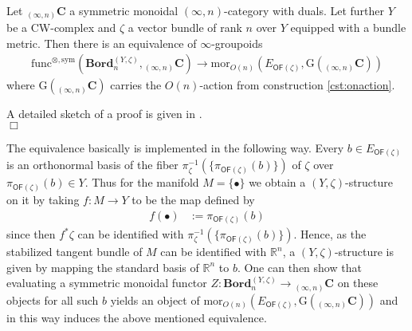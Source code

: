 \\
\begin{thm}
\label{thm:cobhypyzstruct}
Let ${_{(\infty,n)}}\mathbf{C}$ a symmetric monoidal $(\infty,n)$-category with duals. Let further $Y$ be a CW-complex and $\zeta$ a vector bundle of rank $n$ over $Y$ equipped with a bundle metric. Then there is an equivalence of $\infty$-groupoids
\begin{align*}
  \mathrm{func}^{\otimes,\mathrm{sym}}
  \left(
    \mathbf{Bord}_{n}^{(Y,\zeta)}
    ,
    {_{(\infty,n)}}\mathbf{C}
  \right)
  \to
  \mathrm{mor}_{O(n)}
  \left(
    E_{\mathsf{OF}(\zeta)}
    ,
    \mathrm{G}({_{(\infty,n)}}\mathbf{C})
  \right)
\end{align*}
where $\mathrm{G}({_{(\infty,n)}}\mathbf{C})$ carries the $O(n)$-action from construction \ref{cst:onaction}.
\end{thm}
\begin{prf}
A detailed sketch of a proof is given in \cite{dfcdc48c}.
\\
\phantom{proven}
\hfill
$\Box$
\end{prf}
The equivalence basically is implemented in the following way. Every $b \in E_{\mathsf{OF}(\zeta)}$ is an orthonormal basis of the fiber $\pi_{\zeta}^{-1}(\lbrace \pi_{\mathsf{OF}(\zeta)}(b) \rbrace)$ of $\zeta$ over $\pi_{\mathsf{OF}(\zeta)}(b) \in Y$. Thus for the manifold $M = \lbrace \bullet \rbrace$ we obtain a $(Y,\zeta)$-structure on it by taking $f \colon M \to Y$ to be the map defined by
\begin{align*}
  f(\bullet)
  &:=
  \pi_{\mathsf{OF}(\zeta)}(b)
\end{align*}
since then $f^{\ast}\zeta$ can be identified with $\pi_{\zeta}^{-1}(\lbrace \pi_{\mathsf{OF}(\zeta)}(b) \rbrace)$. Hence, as the stabilized tangent bundle of $M$ can be identified with $\mathbb{R}^{n}$, a $(Y,\zeta)$-structure is given by mapping the standard basis of $\mathbb{R}^{n}$ to $b$. One can then show that evaluating a symmetric monoidal functor $Z \colon \mathbf{Bord}_{n}^{(Y,\zeta)} \to {_{(\infty,n)}}\mathbf{C}$ on these objects for all such $b$ yields an object of  $\mathrm{mor}_{O(n)}(E_{\mathsf{OF}(\zeta)},\mathrm{G}({_{(\infty,n)}}\mathbf{C}))$ and in this way induces the above mentioned equivalence.
\\
